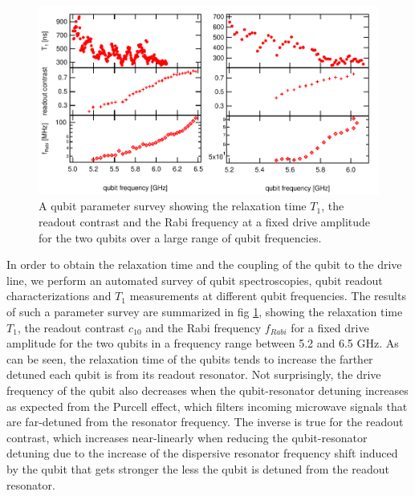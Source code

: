\begin{figure}[ht!]
   \centering
	 \includegraphics[width=1\textwidth]{"./data/ct5/qubits - parameter surveys/qubit parameters"}
	 \caption[A qubit parameter survey showing $T_1$, readout contrast and Rabi frequency of the two qubits over a large range of qubit frequencies]{A qubit parameter survey showing the relaxation time $T_1$, the readout contrast and the Rabi frequency at a fixed drive amplitude for the two qubits over a large range of qubit frequencies.}
	 \label{fig:qubit_parameters}
\end{figure}

In order to obtain the relaxation time and the coupling of the qubit to the drive line, we perform an automated survey of qubit spectroscopies, qubit readout characterizations and $T_1$ measurements at different qubit frequencies. The results of such a parameter survey are summarized in fig \ref{fig:qubit_parameters}, showing the relaxation time $T_1$,  the readout contrast $c_{10}$ and the Rabi frequency $f_{Rabi}$ for a fixed drive amplitude for the two qubits in a frequency range between 5.2 and 6.5 GHz. As can be seen, the relaxation time of the qubits tends to increase the farther detuned each qubit is from its readout resonator. Not surprisingly, the drive frequency of the qubit also decreases when the qubit-resonator detuning increases as expected from the Purcell effect, which filters incoming microwave signals that are far-detuned from the resonator frequency. The inverse is true for the readout contrast, which increases near-linearly when reducing the qubit-resonator detuning due to the increase of the dispersive resonator frequency shift induced by the qubit that gets stronger the less the qubit is detuned from the readout resonator.

\smallskip

